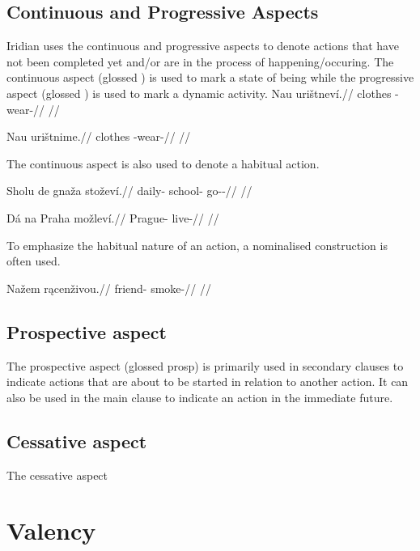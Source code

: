 \subsection{Continuous and Progressive Aspects}
Iridian uses the continuous and progressive aspects to denote actions that have not been completed yet and/or are in the process of happening/occuring. The continuous aspect (glossed ) is used to mark a state of being while the progressive aspect (glossed ) is used to mark a dynamic activity.
\pex
\begingl
\gla Nau urištneví.//
\glb clothes \Refl{}-wear-//
\glft {} //
\endgl
\xe

\pex
\begingl
\gla Nau urištnime.//
\glb clothes \Refl{}-wear-//
\glft {} //
\endgl
\xe

The continuous aspect is also used to denote a habitual action.

\pex
\begingl
\gla Sholu de gnaža stoževí.//
\glb daily-\Ins{}  school-\Acc{} go-\Av{}-\Cont{}//
\glft {} //
\endgl
\xe

\pex
\begingl
\gla Dá na Praha možleví.//
\glb {} \Loc{} Prague-\Acc{} live-//
\glft {} //
\endgl
\xe

To emphasize the habitual nature of an action, a nominalised construction is often used.

\pex
\begingl
\gla Nažem r\k{a}cenživou.//
\glb friend-\First{}\Sg{} smoke-//
\glft {} //
\endgl
\xe

\subsection{Prospective aspect}
\par The prospective aspect (glossed {\sc prosp}) is primarily used in secondary clauses to indicate actions that are about to be started in relation to another action. It can also be used in the main clause to indicate an action in the immediate future.

\subsection{Cessative aspect}
The cessative aspect

\section{Valency}

